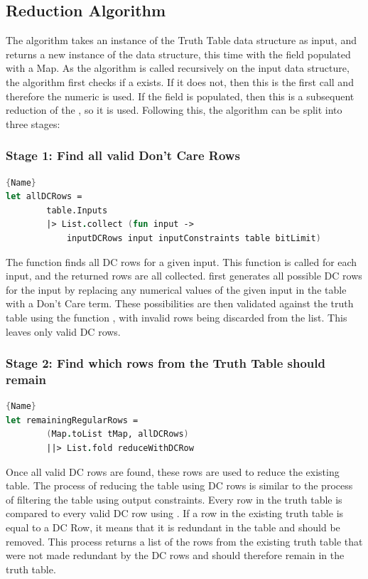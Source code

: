 \subsection{Reduction Algorithm}
The algorithm takes an instance of the Truth Table data structure as input, and returns a new instance of the data structure, this time with the  field populated with a Map. As the algorithm is called recursively on the input data structure, the algorithm first checks if a  exists. If it does not, then this is the first call and therefore the numeric  is used. If the field is populated, then this is a subsequent reduction of the , so it is used. Following this, the algorithm can be split into three stages:

\subsubsection{Stage 1: Find all valid Don't Care Rows}
\begin{lstlisting}[caption=Finding all DC Rows ,frame=tlrb, language=FSharp, label=lst:alldcrows]{Name}
let allDCRows =
        table.Inputs
        |> List.collect (fun input ->
            inputDCRows input inputConstraints table bitLimit)
\end{lstlisting}
The function  finds all DC rows for a given input. This function is called for each input, and the returned rows are all collected.  first generates all possible DC rows for the input by replacing any numerical values of the given input in the table with a Don't Care term. These possibilities are then validated against the truth table using the function , with invalid rows being discarded from the list. This leaves only valid DC rows.

\subsubsection{Stage 2: Find which rows from the Truth Table should remain}
\begin{lstlisting}[caption=Finding which regular rows should remain in the Truth Table ,frame=tlrb, language=FSharp, label=lst:regremain]{Name}
let remainingRegularRows =
        (Map.toList tMap, allDCRows)
        ||> List.fold reduceWithDCRow
\end{lstlisting}
Once all valid DC rows are found, these rows are used to reduce the existing table. The process of reducing the table using DC rows is similar to the process of filtering the table using output constraints. Every row in the truth table is compared to every valid DC row using . If a row in the existing truth table is equal to a DC Row, it means that it is redundant in the table and should be removed. This process returns a list of the rows from the existing truth table that were not made redundant by the DC rows and should therefore remain in the truth table.

